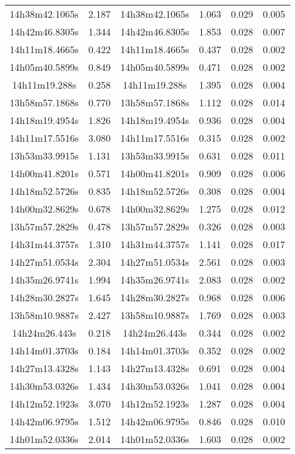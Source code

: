 \begin{table}
\begin{tabular}{cccccc}
14h38m42.1065s & 2.187 & 14h38m42.1065s & 1.063 & 0.029 & 0.005 \\
14h42m46.8305s & 1.344 & 14h42m46.8305s & 1.853 & 0.028 & 0.007 \\
14h11m18.4665s & 0.422 & 14h11m18.4665s & 0.437 & 0.028 & 0.002 \\
14h05m40.5899s & 0.849 & 14h05m40.5899s & 0.471 & 0.028 & 0.002 \\
14h11m19.288s & 0.258 & 14h11m19.288s & 1.395 & 0.028 & 0.004 \\
13h58m57.1868s & 0.770 & 13h58m57.1868s & 1.112 & 0.028 & 0.014 \\
14h18m19.4954s & 1.826 & 14h18m19.4954s & 0.936 & 0.028 & 0.004 \\
14h11m17.5516s & 3.080 & 14h11m17.5516s & 0.315 & 0.028 & 0.002 \\
13h53m33.9915s & 1.131 & 13h53m33.9915s & 0.631 & 0.028 & 0.011 \\
14h00m41.8201s & 0.571 & 14h00m41.8201s & 0.909 & 0.028 & 0.006 \\
14h18m52.5726s & 0.835 & 14h18m52.5726s & 0.308 & 0.028 & 0.004 \\
14h00m32.8629s & 0.678 & 14h00m32.8629s & 1.275 & 0.028 & 0.012 \\
13h57m57.2829s & 0.478 & 13h57m57.2829s & 0.326 & 0.028 & 0.003 \\
14h31m44.3757s & 1.310 & 14h31m44.3757s & 1.141 & 0.028 & 0.017 \\
14h27m51.0534s & 2.304 & 14h27m51.0534s & 2.561 & 0.028 & 0.003 \\
14h35m26.9741s & 1.994 & 14h35m26.9741s & 2.083 & 0.028 & 0.002 \\
14h28m30.2827s & 1.645 & 14h28m30.2827s & 0.968 & 0.028 & 0.006 \\
13h58m10.9887s & 2.427 & 13h58m10.9887s & 1.769 & 0.028 & 0.003 \\
14h24m26.443s & 0.218 & 14h24m26.443s & 0.344 & 0.028 & 0.002 \\
14h14m01.3703s & 0.184 & 14h14m01.3703s & 0.352 & 0.028 & 0.002 \\
14h27m13.4328s & 1.143 & 14h27m13.4328s & 0.691 & 0.028 & 0.004 \\
14h30m53.0326s & 1.434 & 14h30m53.0326s & 1.041 & 0.028 & 0.004 \\
14h12m52.1923s & 3.070 & 14h12m52.1923s & 1.287 & 0.028 & 0.004 \\
14h42m06.9795s & 1.512 & 14h42m06.9795s & 0.846 & 0.028 & 0.010 \\
14h01m52.0336s & 2.014 & 14h01m52.0336s & 1.603 & 0.028 & 0.002 \\

\end{tabular}
\end{table}
